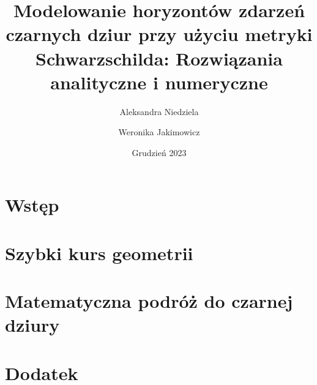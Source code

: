 \documentclass[14pt]{extarticle}
\title{Modelowanie horyzontów zdarzeń czarnych dziur przy użyciu metryki Schwarzschilda: Rozwiązania analityczne i numeryczne}
\author{Aleksandra Niedziela \and Weronika Jakimowicz}
\date{Grudzień 2023}
\begin{document}
\maketitle 
\thispagestyle{empty}
\newpage

\tableofcontents 
\newpage
\setcounter{page}{1}

\section{Wstęp}






\section{Szybki kurs geometrii}





\section{Matematyczna podróż do czarnej dziury}

 



\section{Dodatek}





\end{document}

